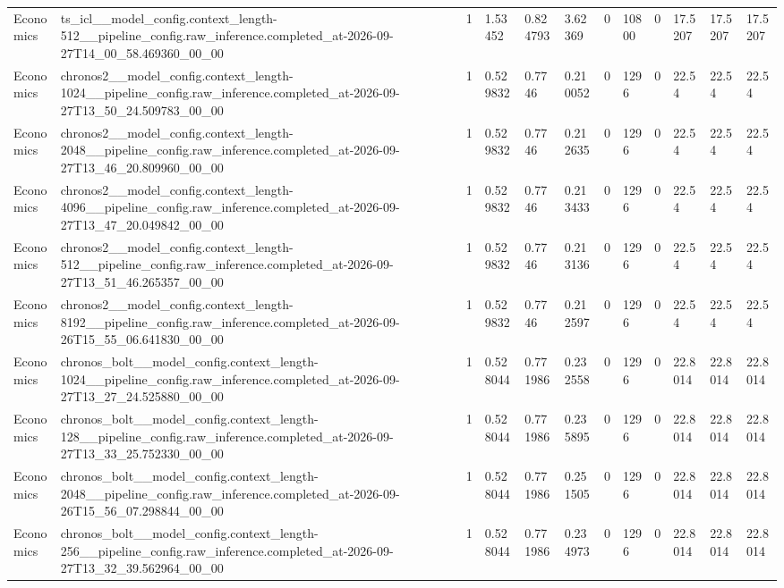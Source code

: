 \begin{tabular}{llllllllllll}
Economics & ts\_icl\_\_model\_config.context\_length-512\_\_pipeline\_config.raw\_inference.completed\_at-2026-09-27T14\_00\_58.469360\_00\_00 & 1 & 1.53452 & 0.824793 & 3.62369 & 0 & 10800 & 0 & 17.5207 & 17.5207 & 17.5207 \\
Economics & chronos2\_\_model\_config.context\_length-1024\_\_pipeline\_config.raw\_inference.completed\_at-2026-09-27T13\_50\_24.509783\_00\_00 & 1 & 0.529832 & 0.7746 & 0.210052 & 0 & 1296 & 0 & 22.54 & 22.54 & 22.54 \\
Economics & chronos2\_\_model\_config.context\_length-2048\_\_pipeline\_config.raw\_inference.completed\_at-2026-09-27T13\_46\_20.809960\_00\_00 & 1 & 0.529832 & 0.7746 & 0.212635 & 0 & 1296 & 0 & 22.54 & 22.54 & 22.54 \\
Economics & chronos2\_\_model\_config.context\_length-4096\_\_pipeline\_config.raw\_inference.completed\_at-2026-09-27T13\_47\_20.049842\_00\_00 & 1 & 0.529832 & 0.7746 & 0.213433 & 0 & 1296 & 0 & 22.54 & 22.54 & 22.54 \\
Economics & chronos2\_\_model\_config.context\_length-512\_\_pipeline\_config.raw\_inference.completed\_at-2026-09-27T13\_51\_46.265357\_00\_00 & 1 & 0.529832 & 0.7746 & 0.213136 & 0 & 1296 & 0 & 22.54 & 22.54 & 22.54 \\
Economics & chronos2\_\_model\_config.context\_length-8192\_\_pipeline\_config.raw\_inference.completed\_at-2026-09-26T15\_55\_06.641830\_00\_00 & 1 & 0.529832 & 0.7746 & 0.212597 & 0 & 1296 & 0 & 22.54 & 22.54 & 22.54 \\
Economics & chronos\_bolt\_\_model\_config.context\_length-1024\_\_pipeline\_config.raw\_inference.completed\_at-2026-09-27T13\_27\_24.525880\_00\_00 & 1 & 0.528044 & 0.771986 & 0.232558 & 0 & 1296 & 0 & 22.8014 & 22.8014 & 22.8014 \\
Economics & chronos\_bolt\_\_model\_config.context\_length-128\_\_pipeline\_config.raw\_inference.completed\_at-2026-09-27T13\_33\_25.752330\_00\_00 & 1 & 0.528044 & 0.771986 & 0.235895 & 0 & 1296 & 0 & 22.8014 & 22.8014 & 22.8014 \\
Economics & chronos\_bolt\_\_model\_config.context\_length-2048\_\_pipeline\_config.raw\_inference.completed\_at-2026-09-26T15\_56\_07.298844\_00\_00 & 1 & 0.528044 & 0.771986 & 0.251505 & 0 & 1296 & 0 & 22.8014 & 22.8014 & 22.8014 \\
Economics & chronos\_bolt\_\_model\_config.context\_length-256\_\_pipeline\_config.raw\_inference.completed\_at-2026-09-27T13\_32\_39.562964\_00\_00 & 1 & 0.528044 & 0.771986 & 0.234973 & 0 & 1296 & 0 & 22.8014 & 22.8014 & 22.8014 \\

\end{tabular}
